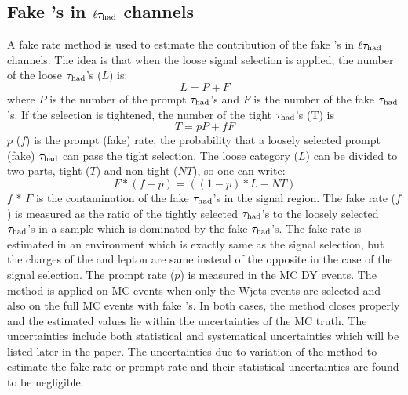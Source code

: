 \subsection{\texorpdfstring{Fake \Tau's in $\ell\tau_{\rm had}$ channels}{Fake taus in lepton-tau channels}}
A fake rate method is used to estimate the contribution of the fake \Tau's in $\ell\tau_{\rm had}$ channels. 
The idea is that when the loose signal selection is applied, the number of the loose $\tau_{\rm had}$'s ($L$) is:
\begin{equation}
L = P + F
\end{equation}
where $P$ is the number of the  prompt $\tau_{\rm had}$'s and $F$ is the number of the  fake $\tau_{\rm had}$'s. If the selection is tightened, the number of the tight $\tau_{\rm had}$'s (T) is
\begin{equation}
 T = pP + fF
\end{equation} 
$p$ ($f$) is the prompt (fake) rate, the probability that a loosely selected prompt (fake) $\tau_{\rm had}$ can pass the  tight  selection. The loose category ($L$) can be divided to two parts, 
tight ($T$) and non-tight ($NT$), so one can write:
\begin{equation}
   F * (f - p) = ((1 - p) * L - NT)
\end{equation}
$f$ * $F$ is the contamination of the fake $\tau_{\rm had}$'s in the signal region. 
The fake rate ($f$) is measured as the ratio of the tightly selected $\tau_{\rm had}$'s to the loosely 
selected $\tau_{\rm had}$'s in a sample which is dominated by the fake $\tau_{\rm had}$'s. The fake rate is estimated in an environment which is exactly 
same as the signal selection, but the charges of the \Tau and lepton are same instead of the opposite in the case of the signal selection.
The prompt rate ($p$) is measured in the MC DY events. The method is applied on MC events when only the Wjets events are selected and 
also on the full MC events with fake \Tau's. In both cases, the method closes properly and the estimated values lie within 
the uncertainties of the MC truth. The uncertainties include both statistical and systematical uncertainties which will be listed later in 
the paper. The uncertainties due to variation of the method to estimate the fake rate or prompt rate and their statistical uncertainties 
are found to be negligible.


